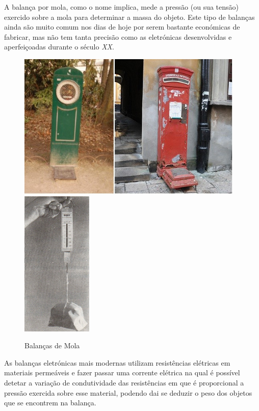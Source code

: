 A balança por mola, como o nome implica, mede a pressão (ou sua tensão) exercido sobre a mola para determinar a massa do objeto. Este tipo de balanças ainda são muito comum nos dias de hoje por serem bastante económicas de fabricar, mas não tem tanta precisão como as eletrónicas desenvolvidas e aperfeiçoadas durante o século \textit{XX}.
\newline
\newline
\begin{minipage}[!b]{\linewidth}
	\begin{figure}[H]
		\captionsetup{justification=raggedright,singlelinecheck=false}
		\flushleft
		\includegraphics[height=7cm]{./image/PESTA/general/Public_Body_Scales_1.jpg}
		\hspace{.8cm}
		\includegraphics[height=7cm]{./image/PESTA/general/Balanca_Mola_1.jpg}
		\caption{Balanças de Mola}
		\label{Balanca_Mola_1}
	\end{figure}
\end{minipage}
\newpage
As balanças eletrónicas mais modernas utilizam resistências elétricas em materiais permeáveis e fazer passar uma corrente elétrica na qual é possível detetar a variação de condutividade das resistências em que é proporcional a pressão exercida sobre esse material, podendo dai se deduzir o peso dos objetos que se encontrem na balança. \\
